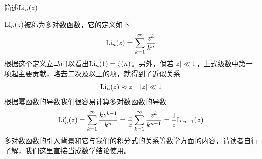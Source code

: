 \documentclass[../../main.tex]{subfiles}
\begin{document}
\begin{example}
    简述\(\mathrm{Li}_{n}(z)\)
    \begin{solution}
        \(\mathrm{Li}_{n}(z)\)被称为多对数函数，它的定义如下
        \begin{equation}
            \mathrm{Li}_{n}(z)=\sum_{k=1}^{\infty}\frac{z^k}{k^n}
        \end{equation}
    根据这个定义立马可以看出\(\mathrm{Li}_n(1)=\zeta(n)\)。另外，倘若\(\abs{z}\ll1\)，上式级数中第一项起主要贡献，略去二次及以上的项，就得到了近似关系
    \begin{equation}
        \mathrm{Li}_n(z)\approx z\quad \abs{z}\ll1
    \end{equation}
    根据幂函数的导数我们很容易计算多对数函数的导数
    \begin{equation}
        \mathrm{Li}_n'(z)=\sum_{k=1}^{\infty}\frac{kz^{k-1}}{k^n}=\frac{1}{z}\sum_{k=1}^{\infty}\frac{z^k}{k^{n-1}}=\frac{1}{z}\mathrm{Li}_{n-1}(z)
    \end{equation}
    多对数函数的引入背景和它与我们的积分式的关系等数学方面的内容，请读者自行了解，我们这里直接当成数学结论使用。
    \end{solution}
\end{example}
\end{document}

